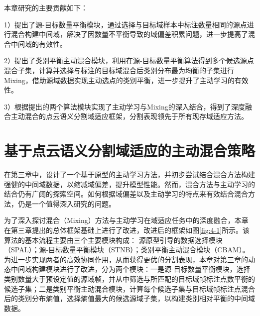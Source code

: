     本章研究的主要贡献如下：

    1）提出了源-目标数量平衡模块，通过选择与目标域样本中标注数量相同的源点进行混合构建中间域，解决了因数量不平衡导致的域偏差积累问题，进一步提高了混合中间域的有效性。

    2）提出了类别平衡主动混合模块，利用在源-目标数量平衡算法得到多个候选源点混合子集，计算并选择与标注的目标域混合后类别分布最为均衡的子集进行Mixing，借助源域数据实现主动选点的类别平衡，进一步提升了主动学习的有效性。

    3）根据提出的两个算法模块实现了主动学习与Mixing的深入结合，得到了深度融合主动混合的点云语义分割域适应框架，分割表现领先于所有现存域适应方法。


    \section{基于点云语义分割域适应的主动混合策略}
    在第三章中，设计了一个基于原型的主动学习方法，并初步尝试结合混合方法构建强健的中间域数据，以缩减域偏差，提升模型性能。然而，混合方法与主动学习的结合仍有广阔的探索空间。如何根据域偏差以及主动学习的特点来有效结合混合方法，仍是一个值得深入研究的问题。

    为了深入探讨混合（Mixing）方法与主动学习在域适应任务中的深度融合，本章在第三章提出的总体框架基础上进行了改进，改进后的框架如图\ref{fig:4-1}所示。该算法的基本流程主要由三个主要模块构成：%
    源原型引导的数据选择模块（SPAL）；源-目标数量平衡模块（STNB）；类别平衡主动混合模块（CBAM）。为进一步实现两者的高效协同作用，从而获得更优的分割表现，本章对第三章的动态中间域构建模块进行了改进，分为两个模块：一是源-目标数量平衡模块，选择类别数量大于预设定值的源域帧，并从中筛选与所匹配的目标域帧标注点数平衡的候选子集；二是类别平衡主动混合模块，计算每个候选子集与目标域帧标注点混合后的类别分布熵值，选择熵值最大的候选源域子集，以构建类别相对平衡的中间域数据。

